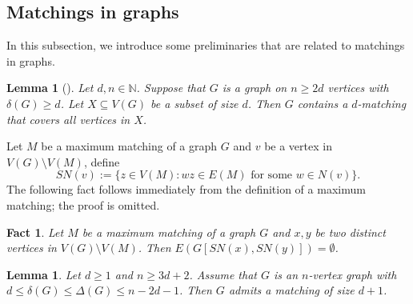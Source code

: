 \documentclass[11pt, a4paper]{article}
\newtheorem{lemma}[theorem]{Lemma}
\newtheorem{fact}[theorem]{Fact}
\theoremstyle{definition}
\newcommand{\<}{\subseteq}
\begin{document}
\subsection{Matchings in graphs}
In this subsection, we  introduce some preliminaries that are related to matchings in graphs. 
\begin{lemma}[\cite{Treg2015}]\label{matching}
    Let $d,n \in \mathbb{N}$. Suppose that $G$ is a graph on $n\ge 2d$ vertices with  $\delta(G)\ge d$. Let $X\subseteq V(G)$ be a subset of size $d$.  Then $G$ contains a $d$-matching that covers all vertices in $X$. 
\end{lemma}
Let $M$ be a maximum matching of a graph $G$ and $v$ be a vertex in $V(G)\setminus V(M)$, define 
$$
SN(v):=\{z\in V(M):wz\in E(M) \text{ for some } w\in N(v)\}.
$$
The following fact follows immediately from the definition of a maximum matching; the proof is omitted.  
\begin{fact}\label{MMProperty}
   Let $M$ be a maximum matching of a graph $G$ and $x,y$ be two distinct vertices in $V(G)\setminus V(M)$. %
   Then $E(G[SN(x),SN(y)])=\emptyset$. %
\end{fact}

    

\begin{lemma}\label{MStab}
    Let $d\ge 1$ and $n\ge 3d+2$. Assume that $G$ is an $n$-vertex graph with $d\leq \delta(G)\le \Delta(G)\leq n-2d-1$. Then $G$ admits a matching of size $d+1$. %
\end{lemma}
\end{document}
